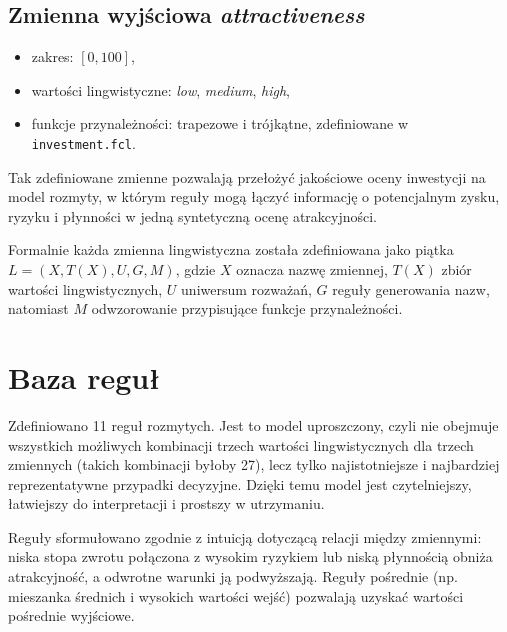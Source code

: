 \documentclass[11pt,a4paper]{article}
\begin{document}
\subsection{Zmienna wyjściowa \textit{attractiveness}}
\begin{itemize}
  \item zakres: $[0, 100]$,
  \item wartości lingwistyczne: \textit{low}, \textit{medium}, \textit{high},
  \item funkcje przynależności: trapezowe i trójkątne, zdefiniowane w \texttt{investment.fcl}.
\end{itemize}

Tak zdefiniowane zmienne pozwalają przełożyć jakościowe oceny inwestycji na model rozmyty,
w którym reguły mogą łączyć informację o potencjalnym zysku, ryzyku i płynności w jedną
syntetyczną ocenę atrakcyjności.

Formalnie każda zmienna lingwistyczna została zdefiniowana jako piątka
$L = (X, T(X), U, G, M)$, gdzie $X$ oznacza nazwę zmiennej, $T(X)$ zbiór wartości
lingwistycznych, $U$ uniwersum rozważań, $G$ reguły generowania nazw, natomiast $M$
odwzorowanie przypisujące funkcje przynależności.

\section{Baza reguł}
Zdefiniowano 11 reguł rozmytych. Jest to model uproszczony, czyli nie obejmuje wszystkich możliwych
kombinacji trzech wartości lingwistycznych dla trzech zmiennych (takich kombinacji byłoby 27), lecz
tylko najistotniejsze i najbardziej reprezentatywne przypadki decyzyjne. Dzięki temu model jest
czytelniejszy, łatwiejszy do interpretacji i prostszy w utrzymaniu.

Reguły sformułowano zgodnie z intuicją dotyczącą relacji między zmiennymi: niska stopa zwrotu
połączona z wysokim ryzykiem lub niską płynnością obniża atrakcyjność, a odwrotne warunki ją podwyższają.
Reguły pośrednie (np. mieszanka średnich i wysokich wartości wejść) pozwalają uzyskać wartości pośrednie
wyjściowe.
\end{document}
